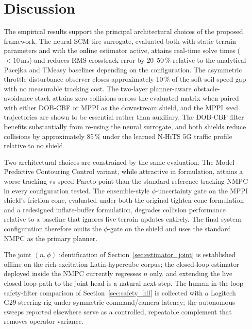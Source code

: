 \documentclass[conference,letterpaper,10pt]{IEEEtran}
\begin{document}
\section{Discussion}
\label{sec:disc}

The empirical results support the principal architectural choices of
the proposed framework. The neural SCM tire surrogate, evaluated
both with static terrain parameters and with the online estimator
active, attains real-time solve times ($<10\,\mathrm{ms}$) and
reduces RMS crosstrack error by 20--50\,\% relative to the
analytical Pacejka and TMeasy baselines depending on the
configuration. The asymmetric throttle disturbance observer closes
approximately 10\,\% of the soft-soil speed gap with no measurable
tracking cost. The two-layer planner-aware obstacle-avoidance stack
attains zero collisions across the evaluated matrix when paired
with either DOB-CBF or MPPI as the downstream shield, and the MPPI
seed trajectories are shown to be essential rather than auxiliary.
The DOB-CBF filter benefits substantially from re-using the neural
surrogate, and both shields reduce collisions by approximately
85\,\% under the learned N-HiTS 5G traffic profile relative to no
shield.

Two architectural choices are constrained by the same evaluation.
The Model Predictive Contouring Control variant, while attractive
in formulation, attains a worse tracking-vs-speed Pareto point than
the standard reference-tracking NMPC in every configuration tested.
The ensemble-style $\phi$-uncertainty gate on the MPPI shield's
friction cone, evaluated under both the original tighten-cone
formulation and a redesigned inflate-buffer formulation, degrades
collision performance relative to a baseline that ignores live
terrain updates entirely. The final system configuration therefore
omits the $\phi$-gate on the shield and uses the standard NMPC as
the primary planner.

The joint $(n,\phi)$ identification of
Section~\ref{sec:estimator_joint} is established offline on the
rich-excitation Latin-hypercube corpus; the closed-loop estimator
deployed inside the NMPC currently regresses $n$ only, and extending
the live closed-loop path to the joint head is a natural next step.
The human-in-the-loop safety-filter comparison of
Section~\ref{sec:safety_hil} is collected with a Logitech G29
steering rig under symmetric command/camera latency; the autonomous
sweeps reported elsewhere serve as a controlled, repeatable
complement that removes operator variance.
\end{document}

